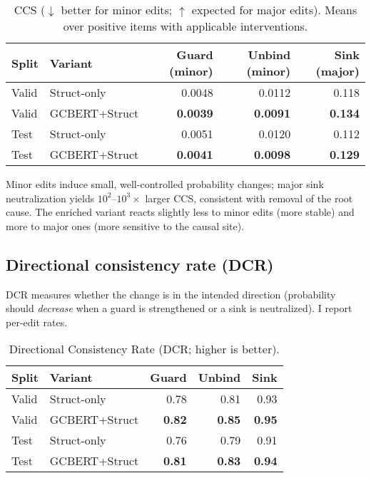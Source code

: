 \documentclass{buthesis}
\begin{document}
\begin{table}[H]
\centering
\small
\setlength{\tabcolsep}{6pt}
\renewcommand{\arraystretch}{1.12}
\caption{CCS ($\downarrow$ better for minor edits; $\uparrow$ expected for major edits). Means over positive items with applicable interventions.}
\label{tab:ccs-by-type}
\begin{tabular}{l l rrr}
\toprule
\textbf{Split} & \textbf{Variant} & \textbf{Guard (minor)} & \textbf{Unbind (minor)} & \textbf{Sink (major)} \\
\midrule
Valid & Struct-only        & 0.0048 & 0.0112 & 0.118 \\
Valid & GCBERT+Struct      & \textbf{0.0039} & \textbf{0.0091} & \textbf{0.134} \\
Test  & Struct-only        & 0.0051 & 0.0120 & 0.112 \\
Test  & GCBERT+Struct      & \textbf{0.0041} & \textbf{0.0098} & \textbf{0.129} \\
\bottomrule
\end{tabular}
\end{table}

Minor edits induce small, well-controlled probability changes; major sink neutralization yields $10^2$–$10^3\times$ larger CCS, consistent with removal of the root cause. The enriched variant reacts slightly less to minor edits (more stable) and more to major ones (more sensitive to the causal site).

\subsection{Directional consistency rate (DCR)}
\label{subsec:dcr}

DCR measures whether the change is in the intended direction (probability should \emph{decrease} when a guard is strengthened or a sink is neutralized). I report per-edit rates.

\begin{table}[H]
\centering
\small
\setlength{\tabcolsep}{6pt}
\renewcommand{\arraystretch}{1.12}
\caption{Directional Consistency Rate (DCR; higher is better).}
\label{tab:dcr}
\begin{tabular}{l l rrr}
\toprule
\textbf{Split} & \textbf{Variant} & \textbf{Guard} & \textbf{Unbind} & \textbf{Sink} \\
\midrule
Valid & Struct-only   & 0.78 & 0.81 & 0.93 \\
Valid & GCBERT+Struct & \textbf{0.82} & \textbf{0.85} & \textbf{0.95} \\
Test  & Struct-only   & 0.76 & 0.79 & 0.91 \\
Test  & GCBERT+Struct & \textbf{0.81} & \textbf{0.83} & \textbf{0.94} \\
\bottomrule
\end{tabular}
\end{table}
\end{document}
